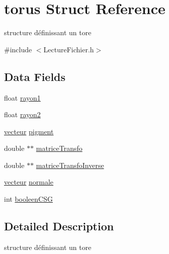 \hypertarget{structtorus}{
\section{torus Struct Reference}
\label{structtorus}
}


structure définissant un tore  




{\ttfamily \#include $<$LectureFichier.h$>$}

\subsection*{Data Fields}
\begin{DoxyCompactItemize}
\item 
float \hyperlink{structtorus_a1b8e70708fd2b25f83f0aacadbe0ddbd}{rayon1}
\item 
float \hyperlink{structtorus_a8630bec8bf19ad824e1527744e48178e}{rayon2}
\item 
\hyperlink{structvecteur}{vecteur} \hyperlink{structtorus_a5a4ee24431a1811fa1c8b75844198987}{pigment}
\item 
double $\ast$$\ast$ \hyperlink{structtorus_aa06ccc348007e3355beccf412f2f656c}{matriceTransfo}
\item 
double $\ast$$\ast$ \hyperlink{structtorus_acd7a3590501dcccfaefccbb658f83821}{matriceTransfoInverse}
\item 
\hyperlink{structvecteur}{vecteur} \hyperlink{structtorus_a944738f40a0294270a0047acc5a77ee2}{normale}
\item 
int \hyperlink{structtorus_a4428e32d4383f7dee25e5a4cb192da24}{booleenCSG}
\end{DoxyCompactItemize}


\subsection{Detailed Description}
structure définissant un tore 

